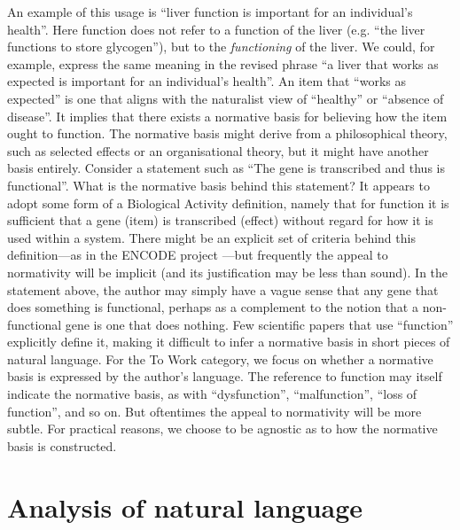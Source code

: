 \documentclass{article}
\begin{document}
An example of this usage is ``liver function is important for an individual's health''.
Here function does not refer to a function of the liver (e.g. ``the liver functions to store glycogen''), but to the \emph{functioning} of the liver.
We could, for example, express the same meaning in the revised phrase ``a liver that works as expected is important for an individual's health''.
An item that ``works as expected'' is one that aligns with the naturalist view of ``healthy'' or ``absence of disease''.
It implies that there exists a normative basis for believing how the item ought to function.
The normative basis might derive from a philosophical theory, such as selected effects or an organisational theory, but it might have another basis entirely.
Consider a statement such as ``The gene is transcribed and thus is functional''.
What is the normative basis behind this statement?
It appears to adopt some form of a Biological Activity definition, namely that for function it is sufficient that a gene (item) is transcribed (effect) without regard for how it is used within a system.
There might be an explicit set of criteria behind this definition---as in the ENCODE project \cite{encode2012} ---but frequently the appeal to normativity will be implicit (and its justification may be less than sound).
In the statement above, the author may simply have a vague sense that any gene that does something is functional, perhaps as a complement to the notion that a non-functional gene is one that does nothing.
Few scientific papers that use ``function'' explicitly define it, making it difficult to infer a normative basis in short pieces of natural language.
For the To Work category, we focus on whether a normative basis is expressed by the author's language.
The reference to function may itself indicate the normative basis, as with ``dysfunction'', ``malfunction'', ``loss of function'', and so on.
But oftentimes the appeal to normativity will be more subtle.
For practical reasons, we choose to be agnostic as to how the normative basis is constructed.

\section{Analysis of natural language}
\label{sec:analys-natur-lang}
\end{document}

